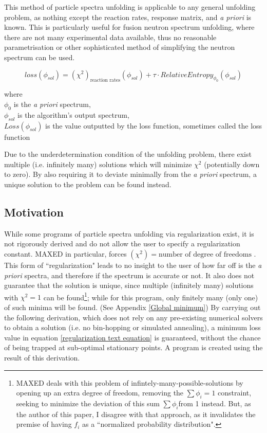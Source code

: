 \documentclass[a4paper, 12pt]{article}
\newcommand{\apriori}[0]{\textit{a priori} }
\begin{document}
This method of particle spectra unfolding is applicable to any general unfolding problem, as nothing except the reaction rates, response matrix, and \apriori is known. This is particularly useful for fusion neutron spectrum unfolding, where there are not many experimental data available, thus no reasonable parametrisation or other sophisticated method of simplifying the neutron spectrum can be used.

\begin{equation} \label{regularization text equation}
loss(\phi_{sol}) = (\chi^2)_{\text{reaction rates}}(\phi_{sol}) + \tau \cdot RelativeEntropy_{\phi_0} (\phi_{sol})
\end{equation}

where\\
    $\phi_0$ is the \apriori spectrum,\\
    $\phi_{sol}$ is the algorithm's output spectrum,\\
    $Loss(\phi_{sol})$ is the value outputted by the loss function, sometimes called the loss function

    Due to the underdetermination condition of the unfolding problem, there exist multiple (i.e. infinitely many) solutions which will minimize $\chi^2$ (potentially down to zero). By also requiring it to deviate minimally from the \apriori spectrum, a unique solution to the problem can be found instead.
\subsection{Motivation}\label{sub:motivation}
    While some programs of particle spectra unfolding via regularization exist, it is not rigorously derived and do not allow the user to specify a regularization constant. MAXED in particular, forces $(\chi^2) = \text{number of degree of freedoms}$ \cite{M.Reginatto-et-al2002-MAXED}. This form of ``regularization" leads to no insight to the user of how far off is the \apriori spectra, and therefore if the spectrum is accurate or not.
    It also does not guarantee that the solution is unique, since multiple (infinitely many) solutions with $\chi^2 = 1$ can be found\footnote{MAXED deals with this problem of infintely-many-possible-solutions by opening up an extra degree of freedom, removing the $\sum \phi_i = 1$ constraint, seeking to minimize the deviation of this sum $\sum \phi_i$from 1 instead. But, as the author of this paper, I disagree with that approach, as it invalidates the premise of having $f_i$ as a ``normalized probability distribution".}; while for this program, only finitely many (only one) of such minima will be found. (See Appendix \ref{Global minimum})
    By carrying out the following derivation, which does not rely on any pre-existing numerical solvers to obtain a solution (i.e. no bin-hopping or simulated annealing), a minimum loss value in equation \ref{regularization text equation} is guaranteed, without the chance of being trapped at sub-optimal stationary points. A program is created using the result of this derivation.
    
\end{document}

